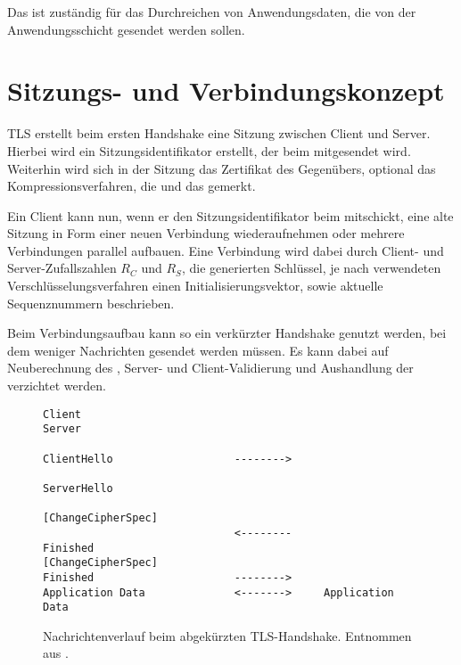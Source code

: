 Das \applicationdataprotocol{} ist zuständig für das Durchreichen von Anwendungsdaten, die von der Anwendungsschicht gesendet werden sollen.

\section{Sitzungs- und Verbindungskonzept}
\label{sec_session_connection}


TLS erstellt beim ersten Handshake eine Sitzung zwischen Client und Server. Hierbei wird ein Sitzungsidentifikator erstellt, der beim \serverhello{} mitgesendet wird. Weiterhin wird sich in der Sitzung das Zertifikat des Gegenübers, optional das Kompressionsverfahren, die \ciphersuite und das \mastersecret{} gemerkt.

Ein Client kann nun, wenn er den Sitzungsidentifikator beim \clienthello{} mitschickt, eine alte Sitzung in Form einer neuen Verbindung wiederaufnehmen oder mehrere Verbindungen parallel aufbauen. Eine Verbindung wird dabei durch Client- und Server-Zufallszahlen \(R_C\) und \(R_S\), die generierten Schlüssel, je nach verwendeten Verschlüsselungsverfahren einen Initialisierungsvektor, sowie aktuelle Sequenznummern beschrieben.

Beim Verbindungsaufbau kann so ein verkürzter Handshake genutzt werden, bei dem weniger Nachrichten gesendet werden müssen. Es kann dabei auf Neuberechnung des \mastersecret{}, Server- und Client-Validierung und Aushandlung der \ciphersuite{} verzichtet werden.

\begin{figure}[]%
	\centering
	\begin{lstlisting}
Client                                                Server

ClientHello                   -------->
                                                 ServerHello
                                          [ChangeCipherSpec]
                              <--------             Finished
[ChangeCipherSpec]
Finished                      -------->
Application Data              <------->     Application Data
	\end{lstlisting}
	\caption{Nachrichtenverlauf beim abgekürzten TLS-Handshake. Entnommen aus \cite{tls12}.}
	\label{fig_abbreviated_handshake}
\end{figure}





